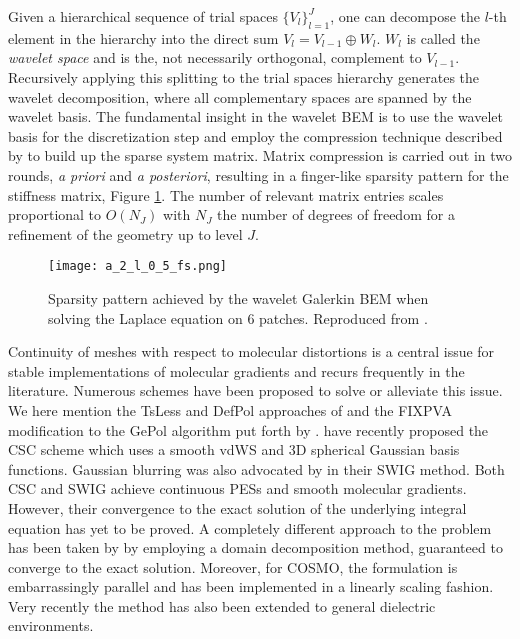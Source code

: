 Given a hierarchical sequence of trial spaces
$\lbrace V_l\rbrace_{l=1}^J$, one can decompose the $l$-th element in
the hierarchy into the direct sum $V_l = V_{l-1} \oplus W_l$.
$W_l$ is called the \emph{wavelet space} and is the, not necessarily
orthogonal, complement to $V_{l-1}$.
Recursively applying this splitting to the trial spaces hierarchy
generates the wavelet decomposition, where all complementary spaces are
spanned by the wavelet basis.
The fundamental insight in the wavelet \acrshort{BEM} is to use the wavelet
basis for the discretization step and employ the compression technique
described by \citeauthor{Dahmen2006-pj} to build up the sparse system
matrix.\autocite{Harbrecht2004-uo, Harbrecht2006-ug, Dahmen2006-pj}
Matrix compression is carried out in two rounds, \emph{a priori} and \emph{a
posteriori}, resulting in a finger-like sparsity pattern for the
stiffness matrix, Figure \ref{fig:finger-structure}.
The number of relevant matrix entries scales proportional to $O(N_J)$
with $N_J$ the number of degrees of freedom for a refinement of the
geometry up to level $J$.

\begin{figure}[tb]
   \texttt{[image: a\_2\_l\_0\_5\_fs.png]}
   \caption[Sparsity pattern achieved by the wavelet Galerkin \acrshort{BEM}.]{
   Sparsity pattern achieved by the wavelet Galerkin \acrshort{BEM} when
   solving the Laplace equation on 6 patches.
   Reproduced from .
   }
   \label{fig:finger-structure}
\end{figure}

Continuity of meshes with respect to molecular distortions is a
central issue for stable implementations of molecular gradients and
recurs frequently in the literature.
Numerous schemes have been proposed to solve or alleviate this issue.
We here mention the TsLess\autocite{Pomelli2004-lb} and
DefPol\autocite{Pomelli1998-ob, Pomelli1999-dc} approaches of
\citeauthor{Pomelli1998-ob} and the FIXPVA
modification\autocite{Su2009-em} to the GePol algorithm put forth by
\citeauthor{Su2009-em}.
\citeauthor{Scalmani2010-tw} have recently proposed the \gls{CSC} scheme
which uses a smooth \acrshort{vdWS} and 3D spherical Gaussian basis
functions.\autocite{Scalmani2010-tw, York1999-xy}
Gaussian blurring was also advocated by \citeauthor{Lange2010-jp} in
their \gls{SWIG} method.\autocite{Lange2010-jp, Lange2010-qo}
Both \acrshort{CSC} and \acrshort{SWIG} achieve continuous \acsp{PES} and smooth
molecular gradients. However, their convergence to the exact solution of
the underlying integral equation has yet to be proved.
A completely different approach to the problem has been taken by
\citeauthor{Cances2013-jg} by employing a domain decomposition
method, guaranteed to converge to the exact solution.\autocite{Quarteroni1999-jt}
Moreover, for \acrshort{COSMO}, the formulation is embarrassingly
parallel and has been implemented in a linearly scaling fashion.\autocite{Cances2013-jg, Lipparini2013-cy, Lipparini2014-to,
Lipparini2014-fq}
Very recently the method has also been extended to general dielectric
environments.\autocite{Stamm2016-fv}

